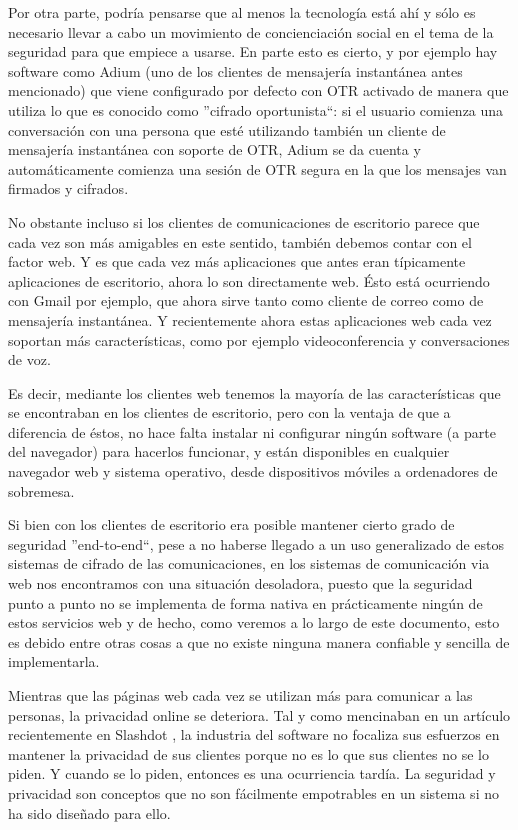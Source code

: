 Por otra parte, podría pensarse que al menos la tecnología está ahí y sólo es necesario llevar a cabo un movimiento de concienciación social en el tema de la seguridad para que empiece a usarse. En parte esto es cierto, y por ejemplo hay software como Adium (uno de los clientes de mensajería instantánea antes mencionado) que viene configurado por defecto con OTR activado de manera que utiliza lo que es conocido como ''cifrado oportunista``: si el usuario comienza una conversación con una persona que esté utilizando también un cliente de mensajería instantánea con soporte de OTR, Adium se da cuenta y automáticamente comienza una sesión de OTR segura en la que los mensajes van firmados y cifrados.

No obstante incluso si los clientes de comunicaciones de escritorio parece que cada vez son más amigables en este sentido, también debemos contar con el factor web. Y es que cada vez más aplicaciones que antes eran típicamente aplicaciones de escritorio, ahora lo son directamente web. Ésto está ocurriendo con Gmail por ejemplo, que ahora sirve tanto como cliente de correo como de mensajería instantánea. Y recientemente ahora estas aplicaciones web cada vez soportan más características, como por ejemplo videoconferencia y conversaciones de voz.

Es decir, mediante los clientes web tenemos la mayoría de las características que se encontraban en los clientes de escritorio, pero con la ventaja de que a diferencia de éstos, no hace falta instalar ni configurar ningún software (a parte del navegador) para hacerlos funcionar, y están disponibles en cualquier navegador web y sistema operativo, desde dispositivos móviles a ordenadores de sobremesa.

Si bien con los clientes de escritorio era posible mantener cierto grado de seguridad ''end-to-end``, pese a no haberse llegado a un uso generalizado de estos sistemas de cifrado de las comunicaciones, en los sistemas de comunicación via web nos encontramos con una situación desoladora, puesto que la seguridad punto a punto no se implementa de forma nativa en prácticamente ningún de estos servicios web y de hecho, como veremos a lo largo de este documento, esto es debido entre otras cosas a que no existe ninguna manera confiable y sencilla de implementarla. 

Mientras que las páginas web cada vez se utilizan más para comunicar a las personas, la privacidad online se deteriora. Tal y como mencinaban en un artículo recientemente en Slashdot \cite{onlineprivacybroken}, la industria del software no focaliza sus esfuerzos en mantener la privacidad de sus clientes porque no es lo que sus clientes no se lo piden. Y cuando  se lo piden, entonces es una ocurriencia tardía. La seguridad y privacidad son conceptos que no son fácilmente empotrables en un sistema si no ha sido diseñado para ello.

